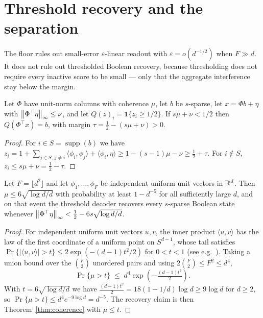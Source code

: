 \section{Threshold recovery and the separation}
\label{sec:threshold}

The floor rules out small-error $\varepsilon$-linear readout with $\varepsilon=o(d^{-1/2})$
when $F\gg d$. It does not rule out thresholded Boolean recovery, because thresholding does
not require every inactive score to be small --- only that the aggregate interference stay
below the margin.

\begin{theorem}
\label{thm:coherence}
Let $\Phi$ have unit-norm columns with coherence $\mu$, let $b$ be $s$-sparse, let
$x=\Phi b+\eta$ with $\left\lVert \Phi^{\top}\eta \right\rVert_\infty\le\nu$, and let $Q(z)_i=\mathbf
1\{z_i\ge1/2\}$. If $s\mu+\nu<1/2$ then $Q(\Phi^{\top}x)=b$, with margin
$\tau=\tfrac12-(s\mu+\nu)>0$.
\end{theorem}

\begin{proof}
For $i\in S=\operatorname{supp}(b)$ we have
$z_i=1+\sum_{j\in S,\,j\neq i}\langle\phi_i,\phi_j\rangle+\langle\phi_i,\eta\rangle
\ge1-(s-1)\mu-\nu\ge\tfrac12+\tau$. For $i\notin S$,
$z_i\le s\mu+\nu=\tfrac12-\tau$.
\end{proof}

\begin{corollary}
\label{cor:randomcode}
Let $F=\lfloor d^2\rfloor$ and let $\phi_1,\dots,\phi_F$ be independent uniform unit vectors in
$\mathbb{R}^d$. Then $\mu\le6\sqrt{\log d/d}$ with probability at least $1-d^{-5}$ for all
sufficiently large $d$, and on that event the threshold decoder recovers every $s$-sparse
Boolean state whenever $\left\lVert \Phi^{\top}\eta \right\rVert_\infty<\tfrac12-6s\sqrt{\log d/d}$.
\end{corollary}

\begin{proof}
For independent uniform unit vectors $u,v$, the inner product $\langle u,v\rangle$ has the law
of the first coordinate of a uniform point on $S^{d-1}$, whose tail satisfies
$\Pr\{|\langle u,v\rangle|>t\}\le2\exp(-(d-1)t^2/2)$ for $0<t<1$
(see e.g.~\cite[Thm.~3.4.6]{vershynin2018hdp}). Taking a union bound over the
$\binom{F}{2}$ unordered pairs and using $2\binom F2\le F^2\le d^4$,
\[
  \Pr\{\mu>t\}\;\le\;d^4\exp\!\left(-\tfrac{(d-1)t^2}{2}\right).
\]
With $t=6\sqrt{\log d/d}$ we have $\tfrac{(d-1)t^2}{2}=18(1-1/d)\log d\ge9\log d$ for $d\ge2$,
so $\Pr\{\mu>t\}\le d^4 e^{-9\log d}=d^{-5}$. The recovery claim is then
Theorem~\ref{thm:coherence} with $\mu\le t$.
\end{proof}

